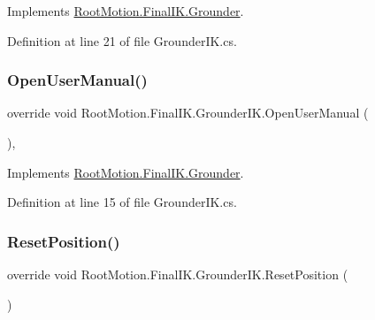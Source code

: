 Implements \mbox{\hyperlink{class_root_motion_1_1_final_i_k_1_1_grounder_a76777e591f7aac441ea52b1b92c41886}{Root\+Motion.\+Final\+I\+K.\+Grounder}}.



Definition at line 21 of file Grounder\+I\+K.\+cs.

\mbox{\label{class_root_motion_1_1_final_i_k_1_1_grounder_i_k_ae94b6c991b39a6fef2931378121969e7}} 
\subsubsection{\texorpdfstring{Open\+User\+Manual()}{OpenUserManual()}}
{\footnotesize\ttfamily override void Root\+Motion.\+Final\+I\+K.\+Grounder\+I\+K.\+Open\+User\+Manual (\begin{DoxyParamCaption}{ }\end{DoxyParamCaption})\hspace{0.3cm}{\ttfamily [protected]}, {\ttfamily [virtual]}}



Implements \mbox{\hyperlink{class_root_motion_1_1_final_i_k_1_1_grounder_af214d235ecea1b81ec637b1b61f756cb}{Root\+Motion.\+Final\+I\+K.\+Grounder}}.



Definition at line 15 of file Grounder\+I\+K.\+cs.

\mbox{\label{class_root_motion_1_1_final_i_k_1_1_grounder_i_k_a4a19512898c60ecd027f535198281b8f}} 
\subsubsection{\texorpdfstring{Reset\+Position()}{ResetPosition()}}
{\footnotesize\ttfamily override void Root\+Motion.\+Final\+I\+K.\+Grounder\+I\+K.\+Reset\+Position (\begin{DoxyParamCaption}{ }\end{DoxyParamCaption})\hspace{0.3cm}{\ttfamily [virtual]}}



